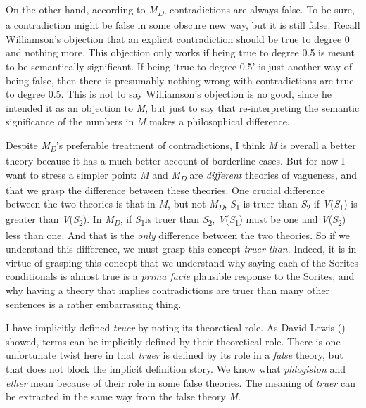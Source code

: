 \documentclass[
  10pt,
  letterpaper,
  DIV=11,
  numbers=noendperiod,
  twoside]{scrartcl}
\begin{document}
On the other hand, according to \emph{M\textsubscript{D}},
contradictions are always false. To be sure, a contradiction might be
false in some obscure new way, but it is still false. Recall
Williamson's objection that an explicit contradiction should be true to
degree 0 and nothing more. This objection only works if being true to
degree 0.5 is meant to be semantically significant. If being `true to
degree 0.5' is just another way of being false, then there is presumably
nothing wrong with contradictions are true to degree 0.5. This is not to
say Williamson's objection is no good, since he intended it as an
objection to \emph{M}, but just to say that re-interpreting the semantic
significance of the numbers in \emph{M} makes a philosophical
difference.

Despite \emph{M\textsubscript{D}}'s preferable treatment of
contradictions, I think \emph{M} is overall a better theory because it
has a much better account of borderline cases. But for now I want to
stress a simpler point: \emph{M} and \emph{M\textsubscript{D}} are
\emph{different} theories of vagueness, and that we grasp the difference
between these theories. One crucial difference between the two theories
is that in \emph{M}, but not \emph{M\textsubscript{D}},
\emph{S}\textsubscript{1} is truer than \emph{S}\textsubscript{2} if
\emph{V}(\emph{S}\textsubscript{1}) is greater than
\emph{V}(\emph{S}\textsubscript{2}). In \emph{M\textsubscript{D}}, if
\emph{S}\textsubscript{1}is truer than \emph{S}\textsubscript{2},
\emph{V}(\emph{S}\textsubscript{1}) must be one and
\emph{V}(\emph{S}\textsubscript{2}) less than one. And that is the
\emph{only} difference between the two theories. So if we understand
this difference, we must grasp this concept \emph{truer than}. Indeed,
it is in virtue of grasping this concept that we understand why saying
each of the Sorites conditionals is almost true is a \emph{prima facie}
plausible response to the Sorites, and why having a theory that implies
contradictions are truer than many other sentences is a rather
embarrassing thing.

I have implicitly defined \emph{truer} by noting its theoretical role.
As David Lewis () showed, terms can be
implicitly defined by their theoretical role. There is one unfortunate
twist here in that \emph{truer} is defined by its role in a \emph{false}
theory, but that does not block the implicit definition story. We know
what \emph{phlogiston} and \emph{ether} mean because of their role in
some false theories. The meaning of \emph{truer} can be extracted in the
same way from the false theory \emph{M}.
\end{document}
